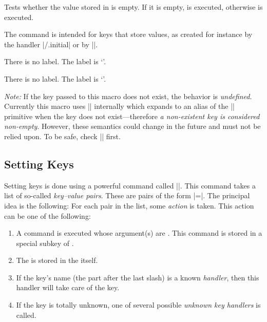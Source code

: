 \begin{command}{\pgfkeysifempty{}}
    Tests whether the value stored in  is empty. If it is
    empty,  is executed, otherwise  is
    executed.

    The command is intended for keys that store values, as created for
    instance by the handler |/.initial| or by |\pgfkeyssetvalue|.
\begin{codeexample}[]

  {There is no label.}
  {The label is `'.}


  {There is no label.}
  {The label is `'.}
\end{codeexample}
    \emph{Note:} If the key passed to this macro does not exist, the behavior is
    \emph{undefined}.  Currently this macro uses |\pgfkeysdetokenizedvalueof|
    internally which expands to an alias of the |\relax| primitive when the key does
    not exist---therefore \emph{a non-existent key is considered non-empty}.
    However, these semantics could change in the future and must not be relied upon.
    To be safe, check |\pgfkeysifdefined| first.
\end{command}

\subsection{Setting Keys}

Setting keys is done using a powerful command called |\pgfkeys|. This command
takes a list of so-called \emph{key--value pairs}. These are pairs of the form
|=|. The principal idea is the following: For each pair
in the list, some \emph{action} is taken. This action can be one of the
following:
%
\begin{enumerate}
    \item A command is executed whose argument(s) are . This
        command is stored in a special subkey of .
    \item The  is stored in the  itself.
    \item If the key's name (the part after the last slash) is a known
        \emph{handler}, then this handler will take care of the key.
    \item If the key is totally unknown, one of several possible \emph{unknown
        key handlers} is called.
\end{enumerate}

